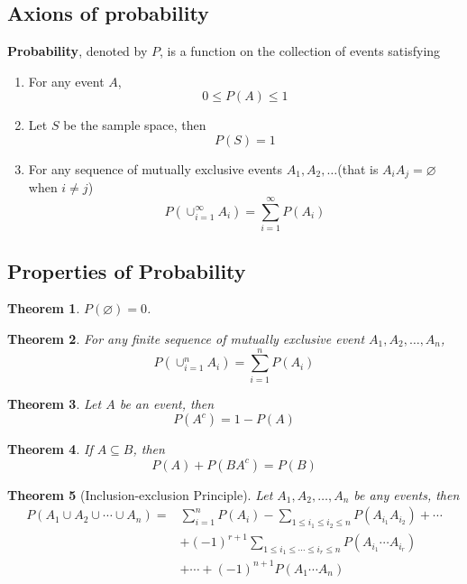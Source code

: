 \documentclass[12pt]{article}
\newtheorem{theorem}{Theorem}[section]
\theoremstyle{definition}
\begin{document}
\subsection{Axions of probability}
\textbf{Probability}, denoted by $P$, is a function on the collection of events satisfying
\begin{enumerate}[label=(\roman*)]
\item For any event $A$,
\[
0\leq P(A)\leq 1
\]
\item Let $S$ be the sample space, then
\[
P(S)=1
\]
\item For any sequence of mutually exclusive events $A_1, A_2,\ldots$(that is $A_iA_j=\varnothing$ when $i\neq j$)
\[
P\left(\cup_{i=1}^{\infty}A_i\right)=\sum_{i=1}^{\infty}P(A_i)
\]
\end{enumerate}
\subsection{Properties of Probability}
\begin{theorem}\normalfont $P(\varnothing)=0$.\end{theorem}
\begin{theorem}\normalfont For any finite sequence of mutually exclusive event $A_1,A_2,\ldots, A_n$,
\[
P\left(\cup^n_{i=1}A_i\right)=\sum^n_{i=1}P(A_i)
\]
\end{theorem}
\begin{theorem}\normalfont Let $A$ be an event, then
\[
P(A^c)=1-P(A)
\]
\end{theorem}
\begin{theorem}\normalfont If $A\subseteq B$, then
\[
P(A)+P(BA^c)=P(B)
\]
\end{theorem}
\begin{theorem}[Inclusion-exclusion Principle]\normalfont Let $A_1,A_2,\ldots,A_n$ be any events, then
\begin{equation*}
\begin{aligned}
P(A_1\cup A_2\cup \cdots\cup A_n)=&\sum_{i=1}^n P(A_i) -\sum_{1\leq i_1\leq i_2\leq n}P(A_{i_1}A_{i_2})+\cdots\\&+(-1)^{r+1}\sum_{1\leq i_1\leq\cdots\leq i_r\leq n}P(A_{i_1}\cdots A_{i_r})\\&+\cdots+(-1)^{n+1}P(A_1\cdots A_n)
\end{aligned}
\end{equation*}
\end{theorem}
\end{document}
